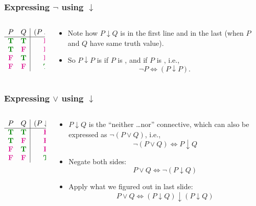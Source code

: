 \begin{frame}
    \frametitle{Expressing $\lnot$ using $\downarrow$}

\begin{columns}
\begin{column}{3cm}
\[\begin{array}{cc|c}
P & Q & (P \downarrow Q)\\
\hline
\True & \True & \False\\
\True & \False & \False\\
\False & \True & \False\\
\False & \False & \True
\end{array}\]
\end{column}
\begin{column}{7cm}
\begin{itemize}[<+->]
\item Note how $P \downarrow Q$ is \False{} in the first line and \True{} in the last (when $P$ and $Q$ have same truth value).
\item So $P \downarrow P$ is \False{} if $P$ is \True, and \True{} if $P$ is \False, i.e., \[
\lnot P \Leftrightarrow (P \downarrow P).
\]
\end{itemize}
\end{column}
\end{columns}

\end{frame}

\begin{frame}
    \frametitle{Expressing $\lor$ using $\downarrow$}

\begin{columns}
\begin{column}{3cm}
\[\begin{array}{cc|c}
P & Q & (P \downarrow Q)\\
\hline
\True & \True & \False\\
\True & \False & \False\\
\False & \True & \False\\
\False & \False & \True
\end{array}\]
\end{column}
\begin{column}{7cm}
\begin{itemize}[<+->]
\item $P \downarrow Q$ is the ``neither \dots nor'' connective, which can also
be expressed as $\lnot(P \lor Q)$, i.e.,
\[ \lnot(P \lor Q) \Leftrightarrow P \downarrow Q \]
\item Negate both sides:
\[
P \lor Q \Leftrightarrow \lnot(P \downarrow Q)
\]
\item Apply what we figured out in last slide:
\[
P \lor Q \Leftrightarrow (P \downarrow Q)\downarrow(P \downarrow Q)
\]
\end{itemize}
\end{column}
\end{columns}

\end{frame}


